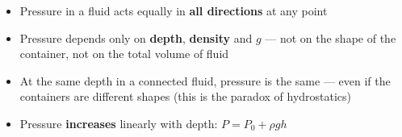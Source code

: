 \begin{keybox}
\begin{itemize}[noitemsep]
  \item Pressure in a fluid acts equally in
  \textbf{all directions} at any point
  \item Pressure depends only on \textbf{depth},
  \textbf{density} and $g$ --- not on the shape
  of the container, not on the total volume of fluid
  \item At the same depth in a connected fluid,
  pressure is the same --- even if the containers
  are different shapes (this is the paradox of
  hydrostatics)
  \item Pressure \textbf{increases} linearly with depth:
  $P = P_0 + \rho g h$
\end{itemize}
\end{keybox}

